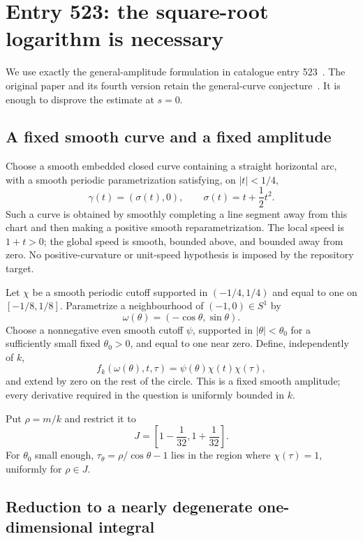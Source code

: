 \documentclass[11pt,a4paper]{article}
\theoremstyle{remark}
\begin{document}
\newpage
\section{Entry 523: the square-root logarithm is necessary}\label{sec:nystrom}

We use exactly the general-amplitude formulation in catalogue entry 523~\cite{repo523}. The original paper and its fourth version retain the general-curve conjecture~\cite{galkowski}. It is enough to disprove the estimate at $s=0$.

\subsection{A fixed smooth curve and a fixed amplitude}

Choose a smooth embedded closed curve containing a straight horizontal arc, with a smooth periodic parametrization satisfying, on $|t|<1/4$,
\begin{equation}\label{eq:localcurve}
 \gamma(t)=(\sigma(t),0),\qquad \sigma(t)=t+\frac12t^2.
\end{equation}
Such a curve is obtained by smoothly completing a line segment away from this chart and then making a positive smooth reparametrization. The local speed is $1+t>0$; the global speed is smooth, bounded above, and bounded away from zero. No positive-curvature or unit-speed hypothesis is imposed by the repository target.

Let $\chi$ be a smooth periodic cutoff supported in $(-1/4,1/4)$ and equal to one on $[-1/8,1/8]$. Parametrize a neighbourhood of $(-1,0)\in S^1$ by
\[
 \omega(\theta)=(-\cos\theta,\sin\theta).
\]
Choose a nonnegative even smooth cutoff $\psi$, supported in $|\theta|<\theta_0$ for a sufficiently small fixed $\theta_0>0$, and equal to one near zero. Define, independently of $k$,
\begin{equation}\label{eq:amp}
 f_k(\omega(\theta),t,\tau)=\psi(\theta)\chi(t)\chi(\tau),
\end{equation}
and extend by zero on the rest of the circle. This is a fixed smooth amplitude; every derivative required in the question is uniformly bounded in $k$.

Put $\rho=m/k$ and restrict it to
\[
 J=\left[1-\frac1{32},1+\frac1{32}\right].
\]
For $\theta_0$ small enough, $\tau_\theta=\rho/\cos\theta-1$ lies in the region where $\chi(\tau)=1$, uniformly for $\rho\in J$.

\subsection{Reduction to a nearly degenerate one-dimensional integral}
\end{document}
